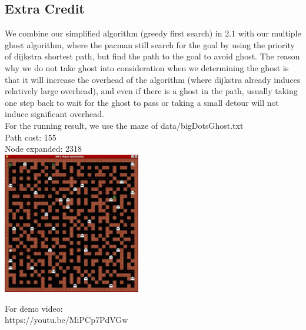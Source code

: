 \begin{multicols*}{2}
\subsection*{Extra Credit}
We combine our simplified algorithm (greedy first search) in 2.1 with our multiple ghost algorithm, where the pacman still search for the goal by using the priority of dijkstra shortest path, but find the path to the goal to avoid ghost. The reason why we do not take ghost into consideration when we determining the ghost is that it will increase the overhead of the algorithm (where dijkstra already induces relatively large overhead), and even if there is a ghost in the path, usually taking one step back to wait for the ghost to pass or taking a small detour will not induce significant overhead.\\
For the running result, we use the maze of data/bigDotsGhost.txt\\
Path cost: 155\\
Node expanded: 2318\\
\includegraphics[width=0.45\textwidth]{graphics/demo2.png}

For demo video:\\
https://youtu.be/MiPCp7PdVGw%
\end{multicols*}
